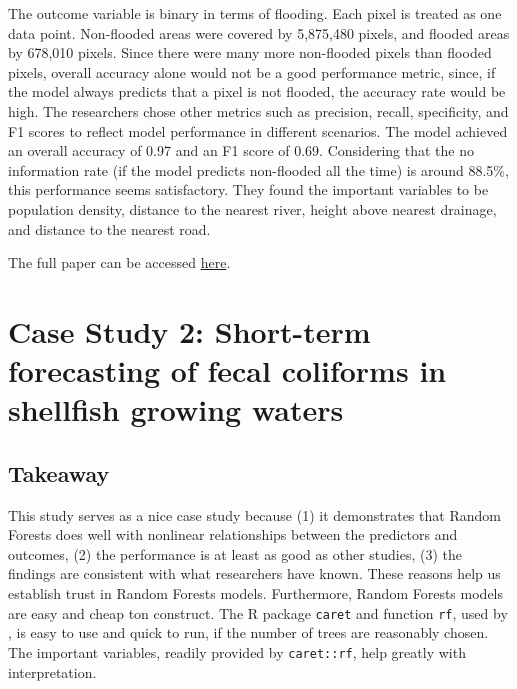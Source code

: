 \documentclass[
]{book}
\begin{document}
The outcome variable is binary in terms of flooding. Each pixel is treated as one data point. Non-flooded areas were covered by 5,875,480 pixels, and flooded areas by 678,010 pixels. Since there were many more non-flooded pixels than flooded pixels, overall accuracy alone would not be a good performance metric, since, if the model always predicts that a pixel is not flooded, the accuracy rate would be high. The researchers chose other metrics such as precision, recall, specificity, and F1 scores to reflect model performance in different scenarios. The model achieved an overall accuracy of 0.97 and an F1 score of 0.69. Considering that the no information rate (if the model predicts non-flooded all the time) is around 88.5\%, this performance seems satisfactory. They found the important variables to be population density, distance to the nearest river, height above nearest drainage, and distance to the nearest road.

The full paper can be accessed \href{https://www.sciencedirect.com/science/article/pii/S1364815223001445?dgcid=author}{here}.

\hypertarget{case-study-2-short-term-forecasting-of-fecal-coliforms-in-shellfish-growing-waters}{%
\section{Case Study 2: Short-term forecasting of fecal coliforms in shellfish growing waters}\label{case-study-2-short-term-forecasting-of-fecal-coliforms-in-shellfish-growing-waters}}

\hypertarget{takeaway-1}{%
\subsection{Takeaway}\label{takeaway-1}}

This study serves as a nice case study because (1) it demonstrates that Random Forests does well with nonlinear relationships between the predictors and outcomes, (2) the performance is at least as good as other studies, (3) the findings are consistent with what researchers have known. These reasons help us establish trust in Random Forests models. Furthermore, Random Forests models are easy and cheap ton construct. The R package \texttt{caret} and function \texttt{rf}, used by \citet{chazal2024}, is easy to use and quick to run, if the number of trees are reasonably chosen. The important variables, readily provided by \texttt{caret::rf}, help greatly with interpretation.
\end{document}
